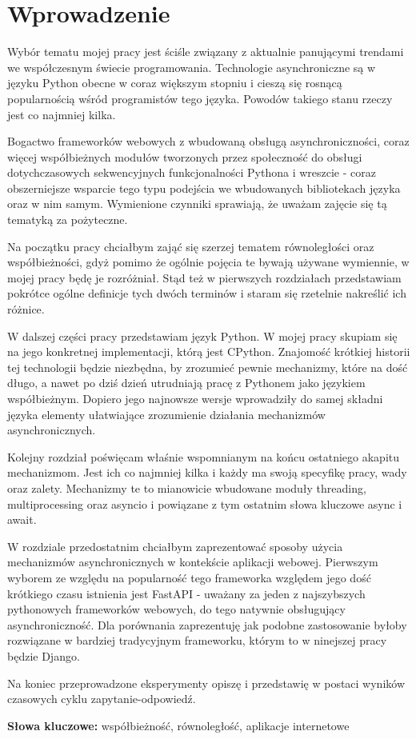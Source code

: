 \chapter{Wprowadzenie}

Wybór tematu mojej pracy jest ściśle związany z aktualnie panującymi trendami we współczesnym świecie programowania. Technologie asynchroniczne są w języku Python obecne w coraz większym stopniu i cieszą się rosnącą popularnością wśród programistów tego języka. Powodów takiego stanu rzeczy jest co najmniej kilka. 

Bogactwo frameworków webowych z wbudowaną obsługą asynchroniczności, coraz więcej współbieżnych modułów tworzonych przez społeczność do obsługi dotychczasowych sekwencyjnych funkcjonalności Pythona i wreszcie - coraz obszerniejsze wsparcie tego typu podejścia we wbudowanych bibliotekach języka oraz  w nim samym. Wymienione czynniki sprawiają, że uważam zajęcie się tą tematyką za pożyteczne.

Na początku pracy chciałbym zająć się szerzej tematem równoległości oraz współbieżności, gdyż pomimo że ogólnie pojęcia te bywają używane wymiennie, w mojej pracy będę je rozróżniał. Stąd też w pierwszych rozdziałach przedstawiam pokrótce ogólne definicje tych dwóch terminów i staram się rzetelnie nakreślić ich różnice.

W dalszej części pracy przedstawiam język Python. W mojej pracy skupiam się na jego konkretnej implementacji, którą jest CPython. Znajomość krótkiej historii tej technologii będzie niezbędna, by zrozumieć pewnie mechanizmy, które na dość długo, a nawet po dziś dzień utrudniają pracę z Pythonem jako językiem współbieżnym. Dopiero jego najnowsze wersje wprowadziły do samej składni języka elementy ułatwiające zrozumienie działania mechanizmów asynchronicznych.

Kolejny rozdział poświęcam właśnie wspomnianym na końcu ostatniego akapitu mechanizmom. Jest ich co najmniej kilka i każdy ma swoją specyfikę pracy, wady oraz zalety. Mechanizmy te to mianowicie wbudowane moduły threading, multiprocessing oraz asyncio i powiązane z tym ostatnim słowa kluczowe async i await.

W rozdziale przedostatnim chciałbym zaprezentować sposoby użycia mechanizmów asynchronicznych w kontekście aplikacji webowej. Pierwszym wyborem ze względu na popularność tego frameworka względem jego dość krótkiego czasu istnienia jest FastAPI - uważany za jeden z najszybszych pythonowych frameworków webowych, do tego natywnie obsługujący asynchroniczność. Dla porównania zaprezentuję jak podobne zastosowanie byłoby rozwiązane w bardziej tradycyjnym frameworku, którym to w ninejszej pracy będzie Django.

Na koniec przeprowadzone eksperymenty opiszę i przedstawię w postaci wyników czasowych cyklu zapytanie-odpowiedź.

\textbf{Słowa kluczowe:} współbieżność, równoległość, aplikacje internetowe